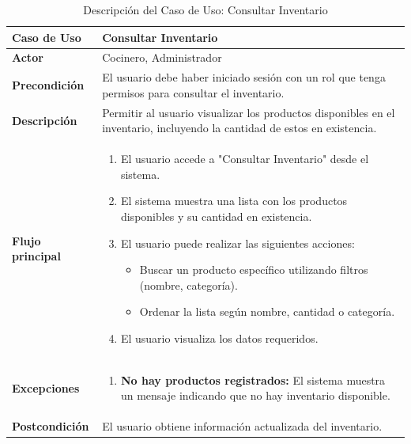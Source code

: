 \documentclass{article}
\begin{document}
\begin{table}[H]
    \centering
    \begin{tabular}{|l|p{12cm}|} 
    \hline
    \textbf{Caso de Uso} & \textbf{Consultar Inventario} \\ \hline
    \textbf{Actor} & Cocinero, Administrador \\ \hline
    \textbf{Precondición} & El usuario debe haber iniciado sesión con un rol que tenga permisos para consultar el inventario. \\ \hline
    \textbf{Descripción} & Permitir al usuario visualizar los productos disponibles en el inventario, incluyendo la cantidad de estos en existencia. \\ \hline
    \textbf{Flujo principal} & 
    \begin{enumerate}
        \item El usuario accede a "Consultar Inventario" desde el sistema.
        \item El sistema muestra una lista con los productos disponibles y su cantidad en existencia.
        \item El usuario puede realizar las siguientes acciones:
        \begin{itemize}
            \item Buscar un producto específico utilizando filtros (nombre, categoría).
            \item Ordenar la lista según nombre, cantidad o categoría.
        \end{itemize}
        \item El usuario visualiza los datos requeridos.
    \end{enumerate} \\ \hline
    \textbf{Excepciones} & 
    \begin{enumerate}
        \item \textbf{No hay productos registrados:} El sistema muestra un mensaje indicando que no hay inventario disponible.
    \end{enumerate} \\ \hline
    \textbf{Postcondición} & El usuario obtiene información actualizada del inventario. \\ \hline
    \end{tabular}
    \caption{Descripción del Caso de Uso: Consultar Inventario}
    \label{tab:caso_uso_consultar_inventario}
\end{table}

\end{document}
